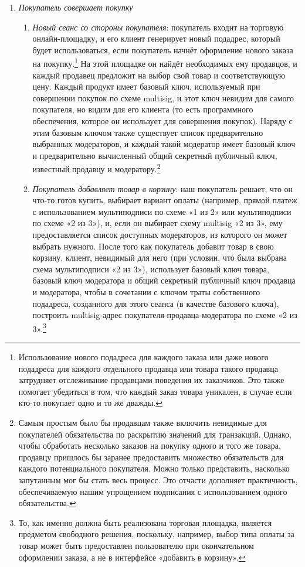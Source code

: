 \begin{enumerate}
    \item {\em Покупатель совершает покупку}
    \begin{enumerate}
        \item {\em Новый сеанс со стороны покупателя}: покупатель входит на торговую онлайн-площадку, и его клиент генерирует новый подадрес, который будет использоваться, если покупатель начнёт оформление нового заказа на покупку.\footnote{Использование нового подадреса для каждого заказа или даже нового подадреса для каждого отдельного продавца или товара такого продавца затрудняет отслеживание продавцами поведения их заказчиков. Это также помогает убедиться в том, что каждый заказ товара уникален, в случае если кто-то покупает одно и то же дважды.} На этой площадке он найдёт необходимых ему продавцов, и каждый продавец предложит на выбор свой товар и соответствующую цену. Каждый продукт имеет базовый ключ, ис\-пользуемый при совершении покупок по схеме multisig, и этот ключ невидим для самого покупателя, но видим для его клиента (то есть программного обеспечения, которое он использует для совершения покупок). Наряду с этим базовым ключом также существует список предварительно выбранных модераторов, и каждый такой модератор имеет базовый ключ и предварительно вычисленный общий секретный публичный ключ, известный продавцу и модератору.\footnote{Самым простым было бы продавцам также включить невидимые для покупателей обязательства по раскрытию значений для транзакций. Однако, чтобы обработать несколько заказов на покупку одного и того же товара, продавцу пришлось бы заранее предоставить множество обязательств для каждого потенциального покупателя. Можно только представить, насколько запутанным мог бы стать весь процесс. Это отчасти дополняет практичность, обеспечиваемую нашим упрощением подписания с использованием одного обязательства.}
        \item {\em Покупатель добавляет товар в корзину}: наш покупатель решает, что он что-то готов купить, выбирает вариант оплаты (например, прямой платеж с использова\-нием мультиподписи по схеме «1 из 2» или мультиподписи по схеме «2 из 3»), и, если он выбирает схему multisig «2 из 3», ему предоставляется список доступных модераторов, из которого он может выбрать нужного. После того как покупатель добавит товар в свою корзину, клиент, невидимый для него (при условии, что была выбрана схема мультиподписи «2 из 3»), использует базовый ключ товара, базовый ключ модератора и общий секретный публичный ключ продавца и модератора, чтобы в сочетании с ключом траты собственного подадреса, созданного для этого сеанса (в качестве базового ключа), построить multisig-адрес покупателя-продавца-модератора по схеме «2 из 3».\footnote{То, как именно должна быть реализована торговая площадка, является предметом свободного решения, поскольку, например, выбор типа оплаты за товар может быть предоставлен пользователю при окончательном оформлении заказа, а не в интерфейсе «добавить в корзину».}\\


\end{enumerate}
\end{enumerate}
